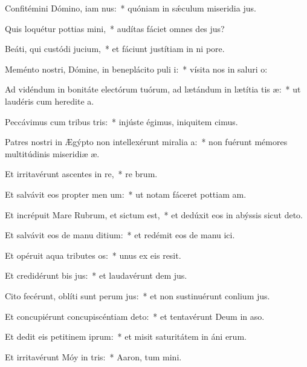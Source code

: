 \item Confitémini Dómino, iam nus:~* quóniam in sǽculum miseridia jus.
\item Quis loquétur pottias mini,~* audítas fáciet omnes des jus?
\item Beáti, qui custódi jucium,~* et fáciunt justítiam in ni pore.
\item Meménto nostri, Dómine, in beneplácito puli i:~* vísita nos in saluri o:
\item Ad vidéndum in bonitáte electórum tuórum, ad lætándum in lætítia tis æ:~* ut laudéris cum heredite a.
\item Peccávimus cum tribus tris:~* injúste égimus, iniquitem cimus.
\item Patres nostri in Ægýpto non intellexérunt miralia a:~* non fuérunt mémores multitúdinis miseridiæ æ.
\item Et irritavérunt ascentes in re,~* re brum.
\item Et salvávit eos propter men um:~* ut notam fáceret pottiam am.
\item Et incrépuit Mare Rubrum, et sictum est,~* et dedúxit eos in abýssis sicut  deto.
\item Et salvávit eos de manu ditium:~* et redémit eos de manu ici.
\item Et opéruit aqua tributes os:~* unus ex eis  resit.
\item Et credidérunt bis jus:~* et laudavérunt dem jus.
\item Cito fecérunt, oblíti sunt perum jus:~* et non sustinuérunt conlium jus.
\item Et concupiérunt concupiscéntiam  deto:~* et tentavérunt Deum in aso.
\item Et dedit eis petitinem iprum:~* et misit saturitátem in áni erum.
\item Et irritavérunt Móy in tris:~* Aaron, tum mini.
